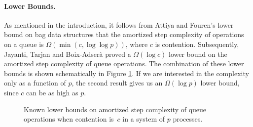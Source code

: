\paragraph{Lower Bounds.}
As mentioned in the introduction, it follows from Attiya and Fouren's lower bound on bag data structures
\cite{DBLP:conf/opodis/AttiyaF17} that the
amortized step complexity of operations on a queue is $\Omega(\min(c,\log\log p))$, where $c$ is contention.
Subsequently, Jayanti, Tarjan and Boix-Adser\`{a} \cite{JTB19} proved a  $\Omega(\log c)$ lower bound on
the amortized step complexity of queue operations.
The combination of these lower bounds is shown schematically in Figure \ref{graph-lb}.
If we are interested in the complexity only as a function of $p$, the second result
gives us an $\Omega(\log p)$ lower bound, since $c$ can be as high as $p$.

\begin{figure}

\caption{Known lower bounds on amortized step complexity of queue operations when contention is~$c$ in a system of $p$ processes.\label{graph-lb}}
\end{figure}

